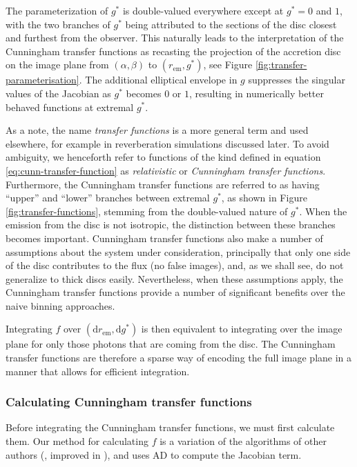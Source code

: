 \documentclass[fleqn,usenatbib]{mnras}
\renewcommand{\d}{\text{d}}
\begin{document}
The parameterization of $g^\ast$ is double-valued everywhere except at $g^\ast =
0$ and $1$, with the two branches of $g^\ast$ being attributed to the sections of the
disc closest and furthest from the observer. This naturally leads to the
interpretation of the Cunningham transfer functions as recasting the projection
of the accretion disc on the image plane from $(\alpha, \beta)$ to
$(r_\text{em}, g^\ast)$, see Figure \ref{fig:transfer-parameterisation}.  The
additional elliptical envelope in $g$ suppresses the singular values of the
Jacobian as $g^\ast$ becomes $0$ or $1$, resulting in numerically better behaved
functions at extremal $g^\ast$.

As a note, the name \emph{transfer functions} is a more general term and used
elsewhere, for example in reverberation simulations discussed later. To avoid
ambiguity, we henceforth refer to functions of the kind defined in equation
\eqref{eq:cunn-transfer-function} as \emph{relativistic} or \emph{Cunningham
transfer functions}. Furthermore, the Cunningham transfer functions are referred
to as having ``upper'' and ``lower'' branches between extremal $g^\ast$, as
shown in Figure \ref{fig:transfer-functions}, stemming from the double-valued
nature of $g^\ast$. When the emission from the disc is not isotropic, the
distinction between these branches becomes important. Cunningham transfer
functions also make a number of assumptions about the system under
consideration, principally that only one side of the disc contributes to the
flux (no false images), and, as we shall see, do not generalize to thick discs
easily. Nevertheless, when these assumptions apply, the Cunningham transfer
functions provide a number of significant benefits over the naive binning
approaches.

Integrating $f$ over $(\d r_\text{em}, \d g^\ast)$ is then equivalent to
integrating over the image plane for only those photons that are coming from the
disc. The Cunningham transfer functions are therefore a sparse way of encoding
the full image plane in a manner that allows for efficient integration.

\subsubsection{Calculating Cunningham transfer functions}

Before integrating the Cunningham transfer functions, we must first calculate
them. Our method for calculating $f$ is a variation of the algorithms of other
authors (\citealp{speith_photon_1995,bambi_testing_2017}, improved in
\citealp{abdikamalov_public_2019}), and uses AD to compute the Jacobian term.
\end{document}

